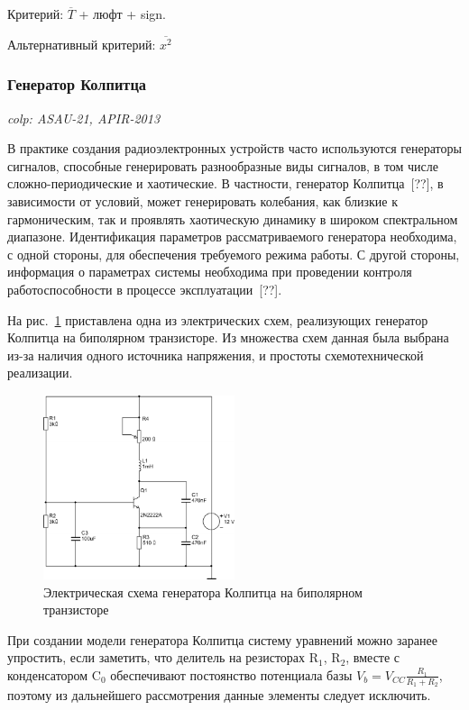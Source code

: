 \documentclass[a4paper,12pt]{article}
\newcommand{\LinkRef}[1]{ \textit{#1} }
\begin{document}
Критерий:
$\overline{T}$ + люфт + sign.

Альтернативный критерий:
$\overline{x^2}$


\FloatBarrier
\subsubsection{Генератор Колпитца} %

\LinkRef{
  colp: ASAU-21, APIR-2013
}

В  практике   создания   радиоэлектронных   устройств   часто   используются
генераторы сигналов, способные генерировать разнообразные виды  сигналов, в том числе
сложно-периодические и хаотические.
В частности, генератор  Колпитца~[??], в  зависимости   от   условий,   может
генерировать  колебания,  как  близкие  к  гармоническим,  так  и  проявлять
хаотическую  динамику  в  широком  спектральном   диапазоне.   Идентификация
параметров рассматриваемого генератора  необходима,  с  одной  стороны,  для
обеспечения  требуемого  режима  работы.  С  другой  стороны,  информация  о
параметрах системы необходима при проведении  контроля  работоспособности  в
процессе эксплуатации~[??].

На рис.~\ref{atu:f:colp_schem} приставлена одна из электрических схем,
реализующих генератор Колпитца на биполярном транзисторе.
Из множества схем данная была выбрана из-за наличия
одного источника напряжения, и простоты схемотехнической реализации.

\begin{figure}[htb!]
\centerline{\includegraphics[width=0.5\textwidth]{p/cha/colp/colp_schem.pdf} }
\caption{Электрическая схема генератора Колпитца на биполярном транзисторе}
\label{atu:f:colp_schem}
\end{figure}

При создании модели генератора Колпитца систему уравнений можно
заранее упростить, если заметить, что
делитель на резисторах
$\mathrm{R}_1$, $\mathrm{R}_2$,
вместе с конденсатором
$\mathrm{C}_0$ обеспечивают
постоянство потенциала базы
$V_b = V_{CC} \frac{R_1}{R_1+R_2}$,
поэтому из дальнейшего рассмотрения данные элементы следует
исключить.
\end{document}
